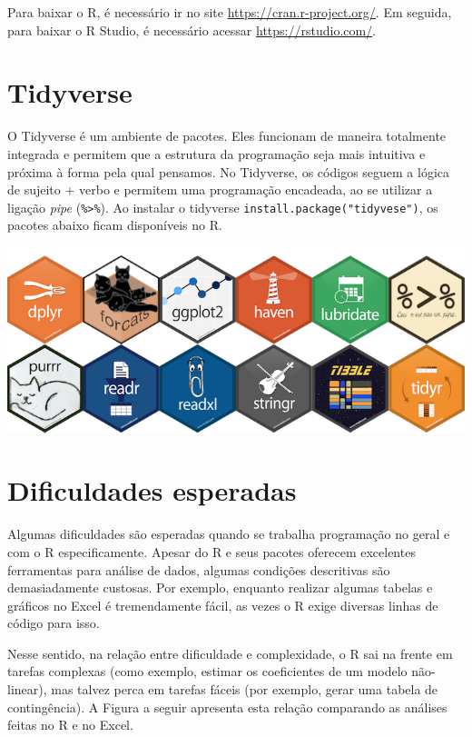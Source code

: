 \documentclass[
]{book}
\begin{document}
Para baixar o R, é necessário ir no site \url{https://cran.r-project.org/}. Em seguida, para baixar o R Studio, é necessário acessar \url{https://rstudio.com/}.

\hypertarget{tidyverse}{%
\section{Tidyverse}\label{tidyverse}}

O Tidyverse é um ambiente de pacotes. Eles funcionam de maneira totalmente integrada e permitem que a estrutura da programação seja mais intuitiva e próxima à forma pela qual pensamos. No Tidyverse, os códigos seguem a lógica de sujeito + verbo e permitem uma programação encadeada, ao se utilizar a ligação \emph{pipe} (\texttt{\%\textgreater{}\%}). Ao instalar o tidyverse \texttt{install.package("tidyvese")}, os pacotes abaixo ficam disponíveis no R.

\includegraphics{./img/tidyverse_website.PNG}

\hypertarget{dificuldades-esperadas}{%
\section{Dificuldades esperadas}\label{dificuldades-esperadas}}

Algumas dificuldades são esperadas quando se trabalha programação no geral e com o R especificamente. Apesar do R e seus pacotes oferecem excelentes ferramentas para análise de dados, algumas condições descritivas são demasiadamente custosas. Por exemplo, enquanto realizar algumas tabelas e gráficos no Excel é tremendamente fácil, as vezes o R exige diversas linhas de código para isso.

Nesse sentido, na relação entre dificuldade e complexidade, o R sai na frente em tarefas complexas (como exemplo, estimar os coeficientes de um modelo não-linear), mas talvez perca em tarefas fáceis (por exemplo, gerar uma tabela de contingência). A Figura a seguir apresenta esta relação comparando as análises feitas no R e no Excel.
\end{document}
